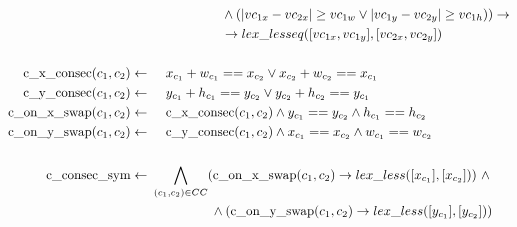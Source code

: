 \begin{align}
                                             & \hspace{2cm} \land (|vc_{1x} - vc_{2x}| \geq vc_{1w} \lor  |vc_{1y} - vc_{2y}| \geq vc_{1h}))  \rightarrow              \nonumber                                 \\
                                             & \hspace{2cm} \rightarrow lex\_lesseq([vc_{1x}, vc_{1y}], [vc_{2x}, vc_{2y}])                                                                                      \\
                                             & \nonumber                                                                                                                                                         \\
  \text{c\_x\_consec}(c_1, c_2)   \leftarrow & \hspace{0.5cm} x_{c_1} + w_{c_1} == x_{c_2} \lor x_{c_2} + w_{c_2} == x_{c_1}                                                                                     \\
  \text{c\_y\_consec}(c_1, c_2)   \leftarrow & \hspace{0.5cm} y_{c_1} + h_{c_1} == y_{c_2} \lor y_{c_2} + h_{c_2} == y_{c_1}                                                                                     \\
  \text{c\_on\_x\_swap}(c_1, c_2) \leftarrow & \hspace{0.5cm} \text{c\_x\_consec}(c_1, c_2) \land y_{c_1} == y_{c_2} \land h_{c_1} == h_{c_2}                                                                    \\
  \text{c\_on\_y\_swap}(c_1, c_2) \leftarrow & \hspace{0.5cm} \text{c\_y\_consec}(c_1, c_2) \land x_{c_1} == x_{c_2} \land w_{c_1} == w_{c_2}                                                                    \\
                                             & \nonumber                                                                                                                                                         \\
  \text{c\_consec\_sym}           \leftarrow & \ \bigwedge_{(c_1, c_2) \in CC} (\text{c\_on\_x\_swap}(c_1, c_2) \rightarrow lex\_less([ x_{c_1} ], [ x_{c_2} ]))\ \land                                \nonumber \\
                                             & \ \hspace{1.6cm} \land (\text{c\_on\_y\_swap}(c_1, c_2) \rightarrow lex\_less([ y_{c_1} ], [ y_{c_2} ]))
\end{align}

